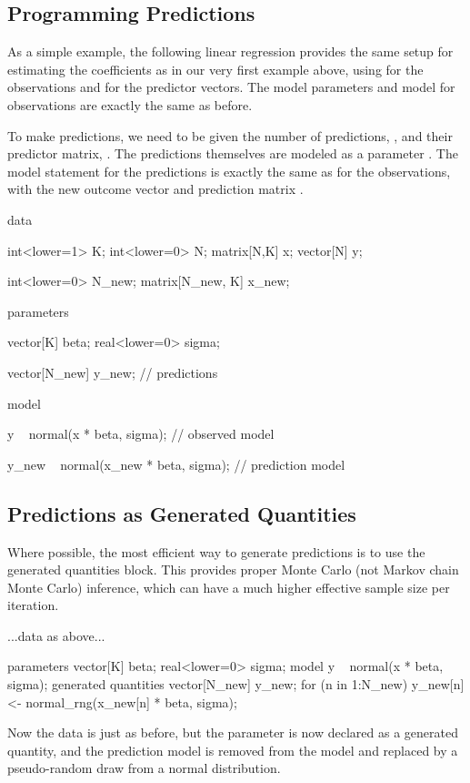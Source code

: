 \subsection{Programming Predictions}

As a simple example, the following linear regression provides the same
setup for estimating the coefficients  as in our very first
example above, using  for the  observations and
 for the  predictor vectors.  The model parameters and
model for observations are exactly the same as before.

To make predictions, we need to be given the number of predictions,
, and their predictor matrix, .  The
predictions themselves are modeled as a parameter .  The
model statement for the predictions is exactly the same as for the
observations, with the new outcome vector  and prediction
matrix .
%
\begin{stancode}
data {
  int<lower=1> K;
  int<lower=0> N;
  matrix[N,K] x;       
  vector[N] y;     

  int<lower=0> N_new;
  matrix[N_new, K] x_new; 
}
parameters {
  vector[K] beta;
  real<lower=0> sigma;

  vector[N_new] y_new;                  // predictions
}
model {
  y ~ normal(x * beta, sigma);          // observed model

  y_new ~ normal(x_new * beta, sigma);  // prediction model
}
\end{stancode}


\subsection{Predictions as Generated Quantities}

Where possible, the most efficient way to generate predictions is to
use the generated quantities block.  This provides proper Monte Carlo
(not Markov chain Monte Carlo) inference, which can have a much higher
effective sample size per iteration.
%
\begin{stancode}
...data as above...

parameters {
  vector[K] beta;
  real<lower=0> sigma;
}
model {
  y ~ normal(x * beta, sigma);         
}
generated quantities {
  vector[N_new] y_new;  
  for (n in 1:N_new)
    y_new[n] <- normal_rng(x_new[n] * beta, sigma);
}
\end{stancode}
%
Now the data is just as before, but the parameter  is now
declared as a generated quantity, and the prediction model is
removed from the model and replaced by a pseudo-random draw from a
normal distribution.

